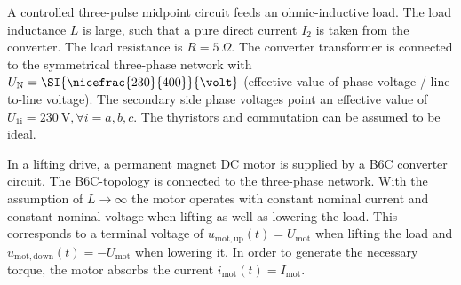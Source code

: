 

A controlled three-pulse midpoint circuit feeds an ohmic-inductive load. The load inductance $L$ is large, such that a pure direct current $I_\mathrm{2}$ is taken from the converter. The load resistance is $R = \SI{5}{\Omega}$. The converter transformer 
is connected to the symmetrical three-phase network with $U_\mathrm{N} = \SI{\nicefrac{230}{400}}{\volt} $ (effective value of phase voltage / line-to-line voltage). The secondary side phase voltages point an effective value of 
$U_\mathrm{1i} = \SI{230}{\volt}, \forall i=a,b,c$. The thyristors and commutation can be assumed to be ideal.






In a lifting drive, a permanent magnet DC motor is supplied by a B6C converter circuit. The B6C-topology is connected to the three-phase network.
With the assumption of $L\rightarrow\infty$ the motor operates with constant nominal current and constant nominal voltage when lifting as well as lowering the load.
This corresponds to a terminal voltage of $u_\mathrm{mot,up}(t)=U_\mathrm{mot}$ when lifting the load and $u_\mathrm{mot,down}(t)=-U_\mathrm{mot}$ when lowering it.
In order to generate the necessary torque, the motor absorbs the current $i_\mathrm{mot}(t)=I_\mathrm{mot}$.


